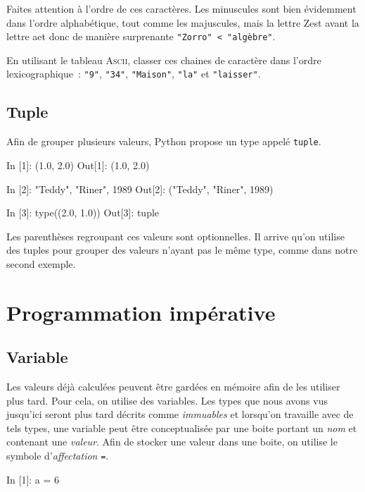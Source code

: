 \documentclass{magnoliaold}
\begin{document}
\noindent
Faites attention à l'ordre de ces caractères. Les minuscules sont bien évidemment
dans l'ordre alphabétique, tout comme les majuscules, mais la lettre \og Z\fg est avant
la lettre \og a\fg et donc de manière surprenante \verb_"Zorro" < "algèbre"_.
\vspace{2ex}
\begin{exoUnique}
\exo En utilisant le tableau \textsc{Ascii}, classer ces chaines de caractère dans l'ordre
  lexicographique~: \verb_"9"_, \verb_"34"_, \verb_"Maison"_, \verb_"la"_ et \verb_"laisser"_.
\end{exoUnique}

\subsection{Tuple}

Afin de grouper plusieurs valeurs, Python propose un type
appelé \verb_tuple_.

\begin{pythoncode}
In [1]: (1.0, 2.0)
Out[1]: (1.0, 2.0)

In [2]: "Teddy", "Riner", 1989
Out[2]: ("Teddy", "Riner", 1989)

In [3]: type((2.0, 1.0))
Out[3]: tuple
\end{pythoncode}

\noindent
Les parenthèses regroupant ces valeurs sont optionnelles.
Il arrive qu'on utilise des tuples pour grouper des valeurs n'ayant pas
le même type, comme dans notre second exemple.

\section{Programmation impérative}
\subsection{Variable}

Les valeurs déjà calculées peuvent être gardées en mémoire afin de les utiliser plus tard.
Pour cela, on utilise des variables. Les types que nous avons vus jusqu'ici
seront plus tard décrits comme \emph{immuables} et lorsqu'on travaille avec de tels types, une
variable peut être conceptualisée par une boite portant un \emph{nom} et contenant une
\emph{valeur}. Afin de stocker une valeur dans une boite, on utilise le symbole
d'\emph{affectation} \og\verb_=_\fg.

\begin{pythoncode}
In [1]: a = 6   
\end{pythoncode}
\end{document}

